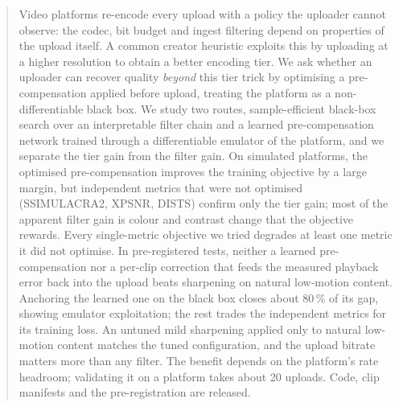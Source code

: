 \begin{abstract}
Video platforms re-encode every upload with a policy the uploader cannot observe: the codec, bit
budget and ingest filtering depend on properties of the upload itself. A common creator heuristic
exploits this by uploading at a higher resolution to obtain a better encoding tier. We ask whether
an uploader can recover quality \emph{beyond} this tier trick by optimising a pre-compensation
applied before upload, treating the platform as a non-differentiable black box. We study two
routes, sample-efficient black-box search over an interpretable filter chain and a learned
pre-compensation network trained through a differentiable emulator of the platform, and we
separate the tier gain from the filter gain. On simulated platforms, the optimised pre-compensation
improves the training objective by a large margin, but independent metrics that were not optimised
(SSIMULACRA2, XPSNR, DISTS) confirm only the tier gain; most of the apparent filter gain is colour
and contrast change that the objective rewards. Every single-metric objective we tried degrades at
least one metric it did not optimise. In pre-registered tests, neither a learned pre-compensation
nor a per-clip correction that feeds the measured playback error back into the upload beats
sharpening on natural low-motion content. Anchoring the learned one on the black box closes about
80\,\% of its gap, showing emulator exploitation; the rest trades the independent metrics for its
training loss. An untuned mild
sharpening applied only to natural low-motion content matches the tuned configuration, and the
upload bitrate matters more than any filter. The benefit depends on the platform's rate headroom;
validating it on a platform takes about 20 uploads.
Code, clip manifests and the pre-registration are released.
\end{abstract}
